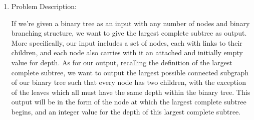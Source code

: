 \documentclass{article}
\begin{document}
\begin{enumerate}
	\item Problem Description:

		If we're given a binary tree as an input with any number of nodes and binary branching structure,
		we want to give the largest complete subtree as output. More specifically, our input includes a
		set of nodes, each with links to their children, and each node also carries with it an attached
		and initially empty value for depth. As for our output, recalling the definition of the largest
		complete subtree, we want to output the largest possible connected subgraph of our
		binary tree such that every node has two children, with the exception of the leaves which all must
		have the same depth within the binary tree. This output will be in the form of the node at which
		the largest complete subtree begins, and an integer value for the depth of this largest complete
		subtree.


\end{enumerate}
\end{document}

